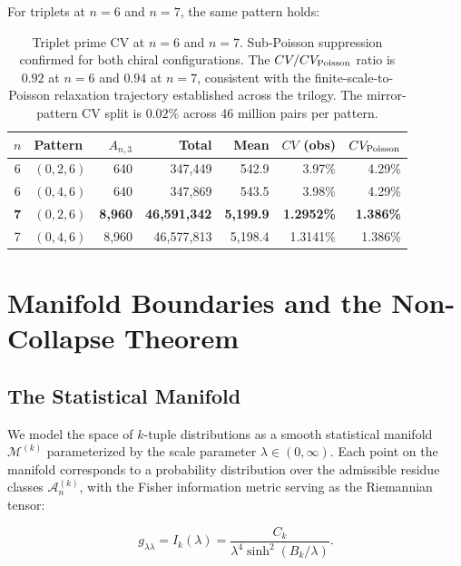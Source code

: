 \documentclass[11pt]{article}
\theoremstyle{remark}
\begin{document}
For triplets at $n=6$ and $n=7$, the same pattern holds:
\begin{table}[h]
\centering
\begin{tabular}{c l r r r r r}
\toprule
$n$ & Pattern & $A_{n,3}$ & Total & Mean & $CV$ (obs) & $CV_{\rm Poisson}$ \\
\midrule
6 & $(0,2,6)$ & 640 & 347{,}449 & 542.9 & 3.97\% & 4.29\% \\
6 & $(0,4,6)$ & 640 & 347{,}869 & 543.5 & 3.98\% & 4.29\% \\
\textbf{7} & \textbf{$(0,2,6)$} & \textbf{8{,}960} & \textbf{46{,}591{,}342} & \textbf{5{,}199.9} & \textbf{1.2952\%} & \textbf{1.386\%} \\
7 & $(0,4,6)$ & 8{,}960 & 46{,}577{,}813 & 5{,}198.4 & 1.3141\% & 1.386\% \\
\bottomrule
\end{tabular}
\caption{Triplet prime CV at $n=6$ and $n=7$. Sub-Poisson suppression
confirmed for both chiral configurations. The $CV/CV_{\rm Poisson}$ ratio
is $0.92$ at $n=6$ and $0.94$ at $n=7$, consistent with the
finite-scale-to-Poisson relaxation trajectory established across the
trilogy. The mirror-pattern CV split is $0.02\%$ across 46 million
pairs per pattern.}
\end{table}

\section{Manifold Boundaries and the Non-Collapse Theorem}
\label{sec:non-collapse}

\subsection{The Statistical Manifold}

We model the space of $k$-tuple distributions as a smooth statistical
manifold $\mathcal{M}^{(k)}$ parameterized by the scale parameter
$\lambda \in (0, \infty)$. Each point on the manifold corresponds to a
probability distribution over the admissible residue classes
$\mathcal{A}_n^{(k)}$, with the Fisher information metric serving as
the Riemannian tensor:

\begin{equation}
g_{\lambda\lambda} = I_k(\lambda) = \frac{C_k}{\lambda^4 \sinh^2(B_k/\lambda)}.
\end{equation}
\end{document}
